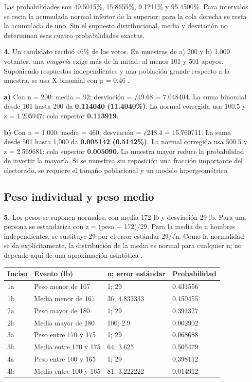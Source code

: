 {Las probabilidades son 49.5015\%, 15.8655\%, 9.1211\% y 95.4500\%. Para intervalos se resta la acumulada normal inferior de la superior; para la cola derecha se resta la acumulada de uno. Sin el supuesto distribucional, media y desviación no determinan esas cuatro probabilidades exactas.

\textbf{4.} Un candidato recibió 46\% de los votos. En muestras de a) 200 y b) 1,000 votantes, una \textit{mayoría} exige más de la mitad: al menos 101 y 501 apoyos. Suponiendo respuestas independientes y una población grande respecto a la muestra, se usa X binomial con p = 0.46 \citep{holmesBusiness2023}.

\textbf{a)} Con n = 200: media = 92; desviación = √49.68 = 7.048404. La suma binomial desde 101 hasta 200 da \textbf{0.114040 (11.4040\%)}. La normal corregida usa 100.5 y z = 1.205947: cola superior \textbf{0.113919}.

\textbf{b)} Con n = 1,000: media = 460; desviación = √248.4 = 15.760711. La suma desde 501 hasta 1,000 da \textbf{0.005142 (0.5142\%)}. La normal corregida usa 500.5 y z = 2.569681: cola superior \textbf{0.005090}. La muestra mayor reduce la probabilidad de invertir la mayoría. Si se muestrea sin reposición una fracción importante del electorado, se requiere el tamaño poblacional y un modelo hipergeométrico.

\clearpage
\subsection{Peso individual y peso medio}
\textbf{5.} Los pesos se suponen normales, con media 172 lb y desviación 29 lb. Para una persona se estandariza con z = (peso − 172)/29. Para la media de n hombres independientes, se sustituye 29 por el error estándar 29/√n. Como la normalidad se da explícitamente, la distribución de la media es normal para cualquier n; no depende aquí de una aproximación asintótica \citep{holmesBusiness2023}.

\begin{center}
\begin{tabular}{llll}
\textbf{Inciso} & \textbf{Evento (lb)} & \textbf{n; error estándar} & \textbf{Probabilidad}\\\hline
1a & Peso menor de 167 & 1; 29 & 0.431556\\
1b & Media menor de 167 & 36; 4.833333 & 0.150455\\
2a & Peso mayor de 180 & 1; 29 & 0.391327\\
2b & Media mayor de 180 & 100; 2.9 & 0.002902\\
3a & Peso entre 170 y 175 & 1; 29 & 0.068688\\
3b & Media entre 170 y 175 & 64; 3.625 & 0.505479\\
4a & Peso entre 100 y 165 & 1; 29 & 0.398112\\
4b & Media entre 100 y 165 & 81; 3.222222 & 0.014912\\
\end{tabular}
\end{center}

}
